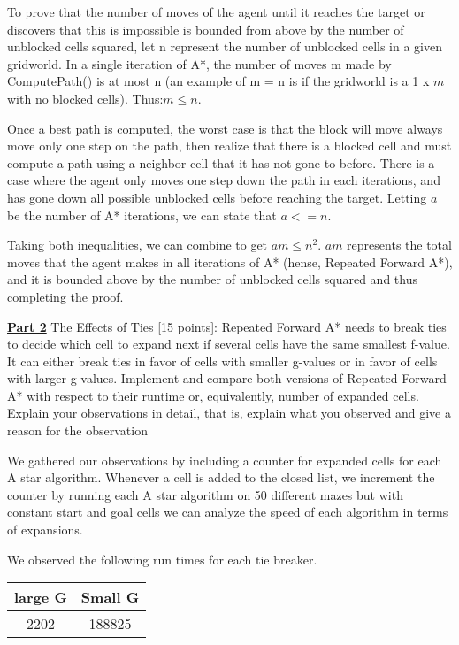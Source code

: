 \documentclass[12pt]{amsart}
\begin{document}
To prove that the number of moves of the agent until it reaches the target or discovers that this is impossible is
bounded from above by the number of unblocked cells squared, let n represent the number of unblocked cells in a given gridworld. In a single iteration of A*, the number of moves m made by ComputePath() is at most n (an example of m = n is if the gridworld is a 1 x $m$ with no blocked cells). Thus:$ m \leq n$.  

Once a best path is computed, the worst case is that the block will move always move only one step on the path, then realize that there is a blocked cell and must compute a path using a neighbor cell that it has not gone to before. There is a case where the agent only moves one step down the path in each iterations, and has gone down all possible unblocked cells before reaching the target. Letting $a$ be the number of A* iterations, we can state that $a <= n$.

Taking both inequalities, we can combine to get $am \leq n^2$. $am$ represents the total moves that the agent makes in all iterations of A* (hense, Repeated Forward A*), and it is bounded above by the number of unblocked cells squared and thus completing the proof. 


\medskip\noindent \textbf{\underline{Part 2}}
 The Effects of Ties [15 points]: Repeated Forward A* needs to break ties to decide which cell to expand next if several cells have the same smallest f-value. It can either break ties in favor of cells with smaller g-values or in favor of cells with larger g-values. Implement and compare both versions of Repeated Forward A* with respect to their runtime or, equivalently, number of expanded cells. Explain your observations in detail, that is, explain what you observed and give a reason for the observation

We gathered our observations by including a counter for expanded cells for each A star algorithm. Whenever a cell is added to the closed list, we increment the counter by running each A star algorithm on 50 different mazes but with constant start and goal cells we can analyze the speed of each algorithm in terms of expansions. 

We observed the following run times for each tie breaker.

\begin{center}
 \begin{tabular}{||c  c||} 
 \hline
 large G & Small G   \\ [0.5ex] 
 \hline\hline
 2202 & 188825 \\ 
 \hline
\end{tabular}
\end{center}
	
\end{document}
